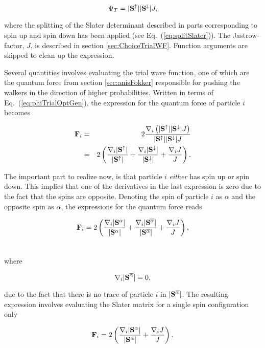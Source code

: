 \begin{equation}
 \Psi_T = |\mathbf{S}^\uparrow||\mathbf{S}^\downarrow |J, \label{eq:phiTrialOptGen}
\end{equation}

where the splitting of the Slater determinant described in parts corresponding to spin up and spin down has been applied (see Eq.~(\ref{eq:splitSlater})). The Jastrow-factor, $J$, is described in section \ref{sec:ChoiceTrialWF}. Function arguments are skipped to clean up the expression. 

Several quantities involves evaluating the trial wave function, one of which are the quantum force from section \ref{sec:anisFokker} responsible for pushing the walkers in the direction of higher probabilities. Written in terms of Eq.~(\ref{eq:phiTrialOptGen}), the expression for the quantum force of particle $i$ becomes 

\begin{eqnarray}
 \mathbf{F}_i &=& 2\frac{\nabla_i\left(|\mathbf{S}^\uparrow||\mathbf{S}^\downarrow |J\right)}{|\mathbf{S}^\uparrow||\mathbf{S}^\downarrow |J} \nonumber\\
     &=& 2\left(\frac{\nabla_i|\mathbf{S}^\uparrow|}{|\mathbf{S}^\uparrow|} + \frac{\nabla_i|\mathbf{S}^\downarrow|}{|\mathbf{S}^\downarrow|} + \frac{\nabla_i J}{J}\right). \nonumber \\
\end{eqnarray}

The important part to realize now, is that particle $i$ \textit{either} has spin up or spin down. This implies that one of the derivatives in the last expression is zero due to the fact that the spins are opposite. Denoting the spin of particle $i$ as $\alpha$ and the opposite spin as $\overline{\alpha}$, the expressions for the quantum force reads

\begin{align}
 \mathbf{F}_i &= 2\left(\frac{\nabla_i|\mathbf{S}^{\alpha}|}{|\mathbf{S}^{\alpha}|} + \frac{\nabla_i|\mathbf{S}^{\overline{\alpha}}|}{|\mathbf{S}^{\overline{\alpha}}|} + \frac{\nabla_i J}{J}\right), \\ \nonumber
\end{align}

where 

\begin{equation}
 \nabla_i|\mathbf{S}^{\overline{\alpha}}| = 0, \label{eq:differentSpinDie}
\end{equation}

due to the fact that there is no trace of particle $i$ in $|\mathbf{S}^{\overline{\alpha}}|$. The resulting expression involves evaluating the Slater matrix for a single spin configuration only

\begin{equation}
 \mathbf{F}_i = 2\left(\frac{\nabla_i|\mathbf{S}^{\alpha}|}{|\mathbf{S}^{\alpha}|} + \frac{\nabla_i J}{J}\right). \nonumber
\end{equation}

